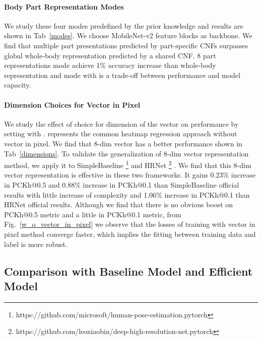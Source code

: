 \documentclass[journal]{IEEEtran}
\begin{document}
\paragraph{Body Part Representation Modes}
\label{part_modes}




  We study these four modes predefined by the prior knowledge and results are shown in Tab~\ref{modes}. We choose MobileNet-v2 \cite{Sandler2018MobileNetV2IR} feature blocks as backbone. We find that multiple part presentations predicted by part-specific CNFs surpasses global whole-body representation predicted by a shared CNF. 8 part representations mode achieve 1\% accuracy increase than whole-body representation and mode with  is a trade-off between performance and model capacity.
  
  
  
  \paragraph{Dimension Choices for Vector in Pixel}
  
  We study the effect of choice for dimension  of the vector on performance by setting  with .  represents the common heatmap regression approach without vector in pixel. We find that 8-dim vector has a better performance shown in Tab~\ref{dimensions}. To validate the generalization of 8-dim vector representation method, we apply it to SimpleBaseline \footnote{https://github.com/microsoft/human-pose-estimation.pytorch} \cite{xiao2018simple} and HRNet \footnote{https://github.com/leoxiaobin/deep-high-resolution-net.pytorch} \cite{Sun_2019_CVPR}. We find that this 8-dim vector representation is effective in these two frameworks. It gains 0.23\% increase in PCKh@0.5 and 0.88\% increase in PCKh@0.1 than SimpleBaseline official results with little increase of complexity and 1.06\% increase in PCKh@0.1 than HRNet official results. Although we find that there is no obvious boost on PCKh@0.5 metric and a little in PCKh@0.1 metric, from Fig.~\ref{w_o_vector_in_pixel} we observe that the losses of training with vector in pixel method converge faster, which implies the fitting between training data and label is more robust. 
  
  \subsection{Comparison with Baseline Model and Efficient Model}
  \label{compare}
  
\end{document}
